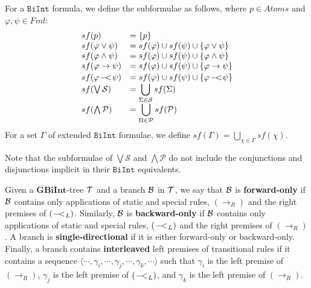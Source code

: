 \documentclass{llncs}
\numberwithin{equation}{section}
\newcommand{\Pred}{{\mathcal{P}}}
\newcommand{\Succ}{{\mathcal{S}}}
\newcommand{\Lg}[1]{\mathtt{#1}}
\newcommand{\ExAnd}{\wedge}
\newcommand{\ExOr}{\vee}
\newcommand{\ExImp}{\rightarrow}
\newcommand{\Fml}{\mathit{Fml}}
\newcommand{\Atoms}{\mathit{Atoms}}
\newcommand{\sequent}{\vdash}
\newcommand{\Imp}{\rightarrow}
\newcommand{\WeakImp}{
\begin{picture}(10,10)
     \put(1,0){$-$}
     \put(7,0){$<$}
   \end{picture}
   \;\; 
}
\newcommand{\mycal}[1]{
        {\cal{#1}}
}
\newcommand {\BiInt}{
        \Lg{BiInt}
}
\newcommand{\GBiInt}{\mathbf{GBiInt}}
\newcommand{\tree}[1]{
        {\mycal{#1}}
}
\newcommand{\ImpRightRule}{({\Imp_R})}
\newcommand{\WeakImpLeftRule}{({\WeakImp_L})}
\begin{document}
\begin{definition}[Subformulae]\label{sf}
For a $\BiInt$ formula, we define the subformulae as follows, where $p \in \Atoms$ and $\varphi, \psi \in \Fml$:
$$
\begin{array}{ll}
	sf(p) 								  		& = \{ p \} \\
	sf(\varphi \ExOr \psi)  		& = sf(\varphi) \cup sf(\psi) \cup \{ \varphi \ExOr \psi \} \\
	sf(\varphi \ExAnd \psi) 		& = sf(\varphi) \cup sf(\psi) \cup \{ \varphi \ExAnd \psi \} \\
	sf(\varphi \ExImp \psi)			& = sf(\varphi) \cup sf(\psi) \cup \{ \varphi \ExImp \psi \} \\
	sf(\varphi \WeakImp \psi)		& = sf(\varphi) \cup sf(\psi) \cup \{ \varphi \WeakImp \psi \} \\	
	sf(\bigvee \Succ)  					& = \displaystyle{\bigcup_{\Sigma \in \Succ}sf(\Sigma)} \\
	sf(\bigwedge \Pred) 				& = \displaystyle{\bigcup_{\Pi \in \Pred}sf(\Pred)}\\
\end{array}
$$
For a set $\Gamma$ of extended $\BiInt$ formulae, we define $sf(\Gamma) = \displaystyle{\bigcup_{\chi \in \Gamma}sf(\chi)}$.
\end{definition}

Note that the subformulae of $\bigvee \Succ$ and $\bigwedge \Pred$ do not include the conjunctions and disjunctions implicit in their $\BiInt$ equivalents.


\begin{definition}
Given a $\GBiInt$-tree $\tree{T}$ and a branch $\mycal{B}$ in $\tree{T}$, we say that $\mycal{B}$ is \textbf{forward-only} if $\mycal{B}$ contains only applications of static and special rules, $\ImpRightRule$ and the right premises of $\WeakImpLeftRule$. Similarly, $\mycal{B}$ is \textbf{backward-only} if $\mycal{B}$ contains only applications of static and special rules, $\WeakImpLeftRule$ and the right premises of $\ImpRightRule$. A branch is \textbf{single-directional} if it is either forward-only or backward-only. Finally, a branch contains \textbf{interleaved} left premises of transitional rules if it contains a sequence $\langle \cdots, \gamma_i, \cdots, \gamma_j, \cdots, \gamma_k, \cdots \rangle$ such that $\gamma_i$ is the left premise of $\ImpRightRule$, $\gamma_j$ is the left premise of $\WeakImpLeftRule$, and $\gamma_k$ is the left premise of $\ImpRightRule$.
\end{definition}
\end{document}
